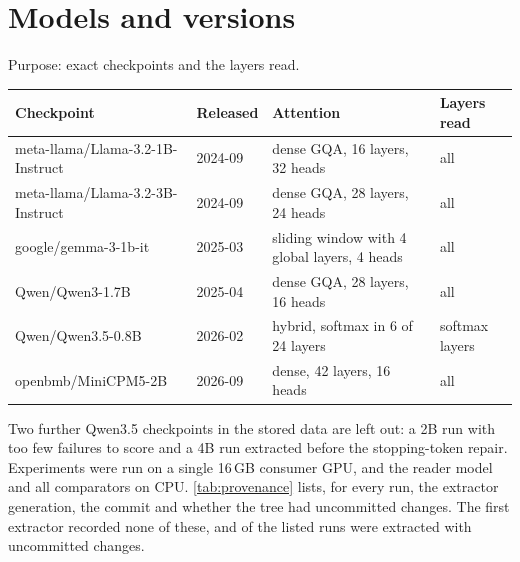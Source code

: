 \section{Models and versions}
\label{app:models}

Purpose: exact checkpoints and the layers read.

\begin{table}[h]
\centering
\small
\caption{The checkpoints, their release month, whether the chat template carries a reasoning mode (disabled at generation throughout) and the number of runs.}
\label{tab:models}

\end{table}

\begin{center}\small
\begin{tabular}{llll}
\toprule
Checkpoint & Released & Attention & Layers read \\
\midrule
meta-llama/Llama-3.2-1B-Instruct & 2024-09 & dense GQA, 16 layers, 32 heads & all \\
meta-llama/Llama-3.2-3B-Instruct & 2024-09 & dense GQA, 28 layers, 24 heads & all \\
google/gemma-3-1b-it & 2025-03 & sliding window with 4 global layers, 4 heads & all \\
Qwen/Qwen3-1.7B & 2025-04 & dense GQA, 28 layers, 16 heads & all \\
Qwen/Qwen3.5-0.8B & 2026-02 & hybrid, softmax in 6 of 24 layers & softmax layers \\
openbmb/MiniCPM5-2B & 2026-09 & dense, 42 layers, 16 heads & all \\
\bottomrule
\end{tabular}
\end{center}

Two further Qwen3.5 checkpoints in the stored data are left out: a 2B run with too few failures to score and a 4B run extracted before the stopping-token repair. Experiments were run on a single 16\,GB consumer GPU, and the reader model and all comparators on CPU. \cref{tab:provenance} lists, for every run, the extractor generation, the commit and whether the tree had uncommitted changes. The first extractor recorded none of these, and \nDirtyRuns{} of the \nProvRuns{} listed runs were extracted with uncommitted changes.

\begin{table}[h]
\centering\small
\caption{Extraction provenance per run, from each run's metadata file. ``first'': the extractor before the audit, which stores no metadata. Uncommitted changes: the tree differed from the recorded commit at extraction time.}
\label{tab:provenance}

\end{table}

